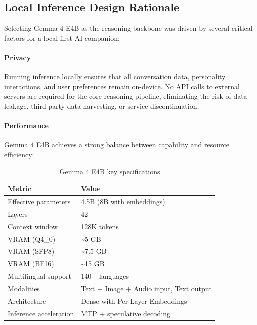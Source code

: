 \documentclass[sigconf]{acmart}
\begin{document}
\subsection{Local Inference Design Rationale}

Selecting Gemma 4 E4B as the reasoning backbone was driven by several critical factors for a local-first AI companion:

\paragraph{Privacy} Running inference locally ensures that all conversation data, personality interactions, and user preferences remain on-device. No API calls to external servers are required for the core reasoning pipeline, eliminating the risk of data leakage, third-party data harvesting, or service discontinuation.

\paragraph{Performance} Gemma 4 E4B achieves a strong balance between capability and resource efficiency:

\begin{table}[htbp]
    \centering
    \caption{Gemma 4 E4B key specifications}
    \label{tab:gemma4specs}
    \begin{tabular}{@{}ll@{}}
        \toprule
        \textbf{Metric} & \textbf{Value} \\
        \midrule
        Effective parameters & 4.5B (8B with embeddings) \\
        Layers & 42 \\
        Context window & 128K tokens \\
        VRAM (Q4\_0) & \textasciitilde 5 GB \\
        VRAM (SFP8) & \textasciitilde 7.5 GB \\
        VRAM (BF16) & \textasciitilde 15 GB \\
        Multilingual support & 140+ languages \\
        Modalities & Text + Image + Audio input, Text output \\
        Architecture & Dense with Per-Layer Embeddings \\
        Inference acceleration & MTP + speculative decoding \\
        \bottomrule
    \end{tabular}
\end{table}
\end{document}

